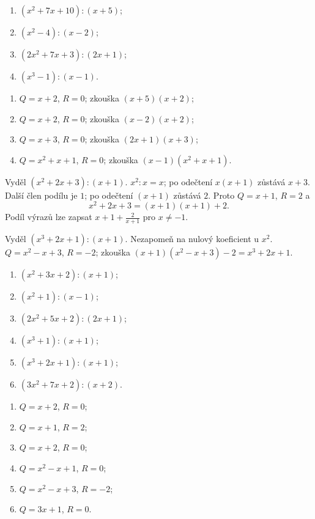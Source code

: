\documentclass[11pt,a4paper]{article}
\begin{document}
\begin{zadaniReseniBox}[breakable=false,title={Samostatná práce 1}]
\begin{enumerate}[label=\alph*)]
\item $(x^2+7x+10):(x+5)$;
\item $(x^2-4):(x-2)$;
\item $(2x^2+7x+3):(2x+1)$;
\item $(x^3-1):(x-1)$.
\end{enumerate}
\tcblower
\begin{enumerate}[label=\alph*)]
\item $Q=x+2$, $R=0$; zkouška $(x+5)(x+2)$;
\item $Q=x+2$, $R=0$; zkouška $(x-2)(x+2)$;
\item $Q=x+3$, $R=0$; zkouška $(2x+1)(x+3)$;
\item $Q=x^2+x+1$, $R=0$; zkouška $(x-1)(x^2+x+1)$.
\end{enumerate}
\end{zadaniReseniBox}
\begin{prikladReseniBox}[breakable=false,title={Příklad 3}]
Vyděl $(x^2+2x+3):(x+1)$.
\tcblower
$x^2:x=x$; po odečtení $x(x+1)$ zůstává $x+3$. Další člen podílu je $1$; po odečtení $(x+1)$ zůstává $2$. Proto $Q=x+1$, $R=2$ a
\[x^2+2x+3=(x+1)(x+1)+2.\]
Podíl výrazů lze zapsat $x+1+\frac2{x+1}$ pro $x\ne-1$.
\end{prikladReseniBox}
\begin{zadaniReseniBox}[breakable=false,title={Rozšíření 1}]
Vyděl $(x^3+2x+1):(x+1)$. Nezapomeň na nulový koeficient u $x^2$.
\tcblower
$Q=x^2-x+3$, $R=-2$; zkouška $(x+1)(x^2-x+3)-2=x^3+2x+1$.
\end{zadaniReseniBox}
\begin{zadaniReseniBox}[breakable=false,title={Domácí úkol}]
\begin{enumerate}[label=\alph*)]
\item $(x^2+3x+2):(x+1)$;
\item $(x^2+1):(x-1)$;
\item $(2x^2+5x+2):(2x+1)$;
\item $(x^3+1):(x+1)$;
\item $(x^3+2x+1):(x+1)$;
\item $(3x^2+7x+2):(x+2)$.
\end{enumerate}
\tcblower
\begin{enumerate}[label=\alph*)]
\item $Q=x+2$, $R=0$;
\item $Q=x+1$, $R=2$;
\item $Q=x+2$, $R=0$;
\item $Q=x^2-x+1$, $R=0$;
\item $Q=x^2-x+3$, $R=-2$;
\item $Q=3x+1$, $R=0$.
\end{enumerate}
\end{zadaniReseniBox}
\end{document}
